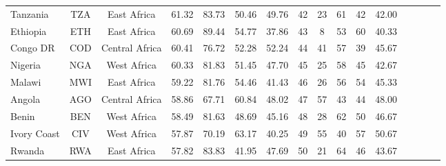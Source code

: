 \begin{singlespace}
{\begin{longtable}[H]{lccccccccccccccc}
Tanzania      & TZA           & East Africa        & 61.32       & 83.73            & 50.46                     & 49.76           & 42             & 23                  & 61                           & 42                 & 42.00                  \\
Ethiopia                          & ETH           & East Africa        & 60.69       & 89.44            & 54.77                     & 37.86           & 43             & 8                   & 53                           & 60                 & 40.33                  \\
Congo DR & COD           & Central Africa     & 60.41       & 76.72            & 52.28                     & 52.24           & 44             & 41                  & 57                           & 39                 & 45.67                  \\
Nigeria                           & NGA           & West Africa        & 60.33       & 81.83            & 51.45                     & 47.70           & 45             & 25                  & 58                           & 45                 & 42.67                  \\
Malawi                            & MWI           & East Africa        & 59.22       & 81.76            & 54.46                     & 41.43           & 46             & 26                  & 56                           & 54                 & 45.33                  \\
Angola                            & AGO           & Central Africa     & 58.86       & 67.71            & 60.84                     & 48.02           & 47             & 57                  & 43                           & 44                 & 48.00                  \\
Benin                             & BEN           & West Africa        & 58.49       & 81.63            & 48.69                     & 45.16           & 48             & 28                  & 62                           & 50                 & 46.67                  \\
Ivory Coast                     & CIV           & West Africa        & 57.87       & 70.19            & 63.17                     & 40.25           & 49             & 55                  & 40                           & 57                 & 50.67                  \\
Rwanda                            & RWA           & East Africa        & 57.82       & 83.83            & 41.95                     & 47.69           & 50             & 21                  & 64                           & 46                 & 43.67                  \\

\end{longtable}}
\end{singlespace}
